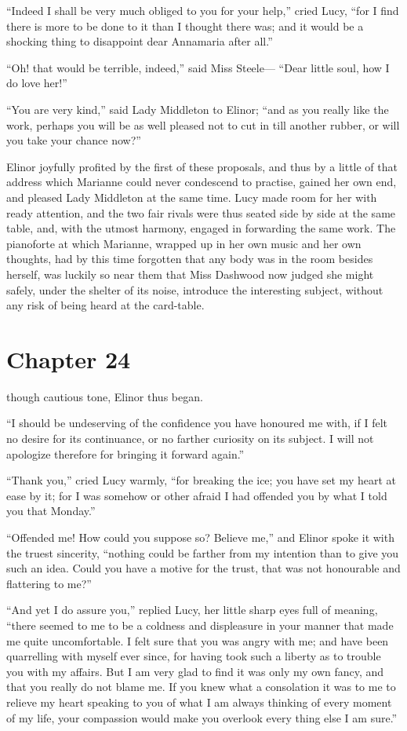 ``Indeed I shall be very much obliged to you
for your help,'' cried Lucy, ``for I find there is more
to be done to it than I thought there was; and it would
be a shocking thing to disappoint dear Annamaria after all.''

``Oh! that would be terrible, indeed,'' said Miss Steele---%
``Dear little soul, how I do love her!''

``You are very kind,'' said Lady Middleton to Elinor;
``and as you really like the work, perhaps you will be
as well pleased not to cut in till another rubber,
or will you take your chance now?''

Elinor joyfully profited by the first of these proposals,
and thus by a little of that address which Marianne
could never condescend to practise, gained her own end,
and pleased Lady Middleton at the same time.  Lucy made room
for her with ready attention, and the two fair rivals were
thus seated side by side at the same table, and, with the
utmost harmony, engaged in forwarding the same work.
The pianoforte at which Marianne, wrapped up in her own
music and her own thoughts, had by this time forgotten
that any body was in the room besides herself, was luckily
so near them that Miss Dashwood now judged she might safely,
under the shelter of its noise, introduce the interesting
subject, without any risk of being heard at the card-table.



\chapter{Chapter 24}


 though cautious tone, Elinor thus began.

``I should be undeserving of the confidence you have
honoured me with, if I felt no desire for its continuance,
or no farther curiosity on its subject.  I will
not apologize therefore for bringing it forward again.''

``Thank you,'' cried Lucy warmly, ``for breaking
the ice; you have set my heart at ease by it; for I was
somehow or other afraid I had offended you by what I
told you that Monday.''

``Offended me! How could you suppose so? Believe me,''
and Elinor spoke it with the truest sincerity,
``nothing could be farther from my intention than to give
you such an idea.  Could you have a motive for the trust,
that was not honourable and flattering to me?''

``And yet I do assure you,'' replied Lucy, her little
sharp eyes full of meaning, ``there seemed to me to be
a coldness and displeasure in your manner that made me
quite uncomfortable.  I felt sure that you was angry with me;
and have been quarrelling with myself ever since, for having
took such a liberty as to trouble you with my affairs.
But I am very glad to find it was only my own fancy,
and that you really do not blame me.  If you knew what a
consolation it was to me to relieve my heart speaking to you
of what I am always thinking of every moment of my life,
your compassion would make you overlook every thing else
I am sure.''

